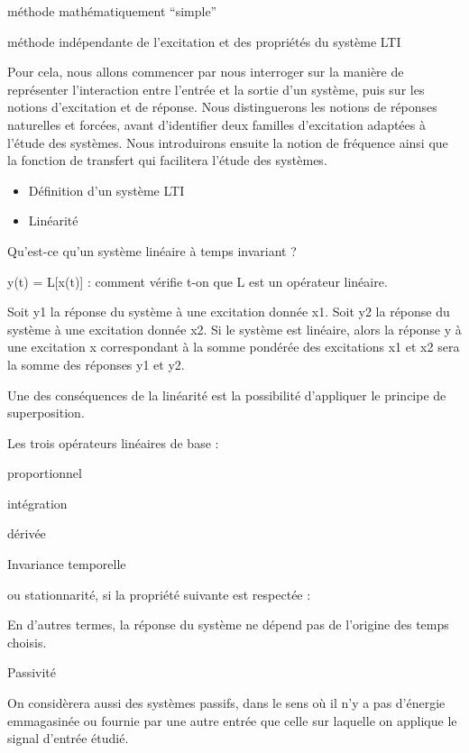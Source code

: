 \documentclass[]{article}
\begin{document}
méthode mathématiquement ``simple''

méthode indépendante de l'excitation et des propriétés du système LTI

Pour cela, nous allons commencer par nous interroger sur la manière de
représenter l'interaction entre l'entrée et la sortie d'un système, puis
sur les notions d'excitation et de réponse. Nous distinguerons les
notions de réponses naturelles et forcées, avant d'identifier deux
familles d'excitation adaptées à l'étude des systèmes. Nous introduirons
ensuite la notion de fréquence ainsi que la fonction de transfert qui
facilitera l'étude des systèmes.

\begin{itemize}
\itemsep1pt\parskip0pt
\item
  Définition d'un système LTI
\end{itemize}

\begin{itemize}
\itemsep1pt\parskip0pt
\item
  Linéarité
\end{itemize}

Qu'est-ce qu'un système linéaire à temps invariant ?~

y(t) = L{[}x(t){]} : comment vérifie t-on que L est un opérateur
linéaire.~

Soit y1 la réponse du système à une excitation donnée x1. Soit y2 la
réponse du système à une excitation donnée x2. Si le système est
linéaire, alors la réponse y à une excitation x correspondant à la somme
pondérée des excitations x1 et x2 sera la somme des réponses y1 et y2.

Une des conséquences de la linéarité est la possibilité d'appliquer le
principe de superposition.

Les trois opérateurs linéaires de base :

proportionnel

intégration

dérivée

Invariance temporelle

ou stationnarité, si la propriété suivante est respectée :

En d'autres termes, la réponse du système ne dépend pas de l'origine des
temps choisis.

Passivité

On considèrera aussi des systèmes passifs, dans le sens où il n'y a pas
d'énergie emmagasinée ou fournie par une autre entrée que celle sur
laquelle on applique le signal d'entrée étudié.
\end{document}
